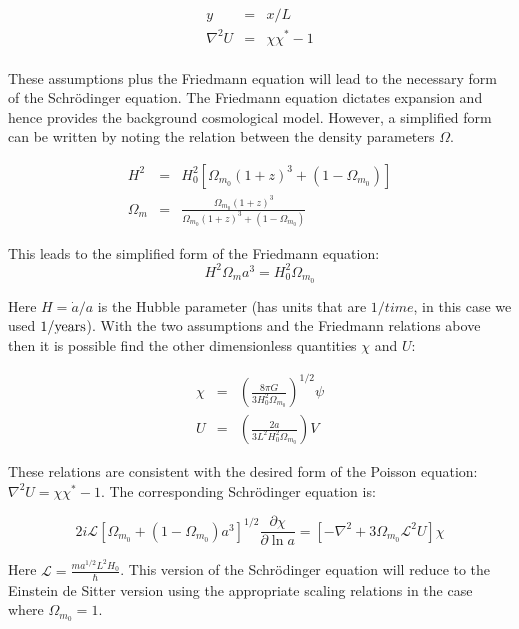 \begin{eqnarray}
y &=& x/L \nonumber \\
\nabla^2 U &=& \chi \chi^* - 1 \\
\end{eqnarray}

\noindent These assumptions plus the Friedmann equation will lead to the necessary form of the Schr\"odinger equation. The Friedmann equation dictates expansion and hence provides the background cosmological model. However, a simplified form can be written by noting the relation between the density parameters $\Omega$.

\begin{eqnarray}
H^2 &=& H_0^2 [\Omega_{m_0} (1 + z)^3 + (1 - \Omega_{m_0})] \nonumber \\
\Omega_m &=& \frac{\Omega_{m_0}(1 + z)^3}{\Omega_{m_0} (1 + z)^3 + (1 - \Omega_{m_0})}
\end{eqnarray}

\noindent This leads to the simplified form of the Friedmann equation:
\begin{equation}
H^2 \Omega_m a^3 = H_0^2 \Omega_{m_0}
\end{equation}

\noindent Here $H = \dot{a}/a$ is the Hubble parameter (has units that are $1/time$, in this case we used $1/ {\rm years}$). With the two assumptions and the Friedmann relations above then it is possible find the other dimensionless quantities $\chi$ and $U$:

\begin{eqnarray}
\chi &=& \left(\frac{8\pi G}{3 H_0^2 \Omega_{m_0}}\right)^{1/2} \psi \nonumber \\
U &=& \left(\frac{2 a}{3 L^2 H_0^2 \Omega_{m_0}}\right) V
\end{eqnarray}

\noindent These relations are consistent with the desired form of the Poisson equation: $\nabla^2 U = \chi \chi^* - 1$. The corresponding Schr\"odinger equation is:

\begin{equation}
2 i \mathcal{L}\left[\Omega_{m_0} +(1-\Omega_{m_0}) a^3 \right]^{1/2} \frac{\partial\chi}{\partial \ln a} = \left[-\nabla^2 + 3\Omega_{m_0}\mathcal{L}^2 U\right] \chi 
\end{equation}

\noindent Here $\mathcal{L} = \frac{m a^{1/2}L^2 H_0}{\hbar}$. This version of the Schr\"odinger equation will reduce to the Einstein de Sitter version using the appropriate scaling relations in the case where $\Omega_{m_0} = 1$.

